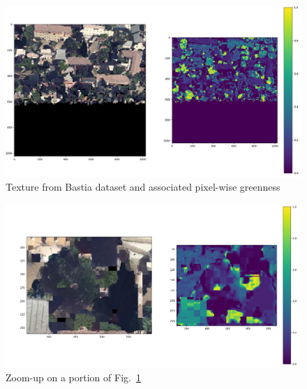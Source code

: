 \documentclass{kththesis}
\begin{document}
\begin{figure}[H]
    \centering
    \includegraphics[width=\textwidth]{images/features/greenness_texture.png}
    \caption{Texture from Bastia dataset and associated pixel-wise greenness}
    \label{fig:greenness_text}
\end{figure}
\begin{figure}[H]
    \centering
    \includegraphics[width=\textwidth]{images/features/greenness_closeup.png}
    \caption{Zoom-up on a portion of Fig.~\ref{fig:greenness_text}}
    \label{fig:greenness_closeup}
\end{figure}
\end{document}
